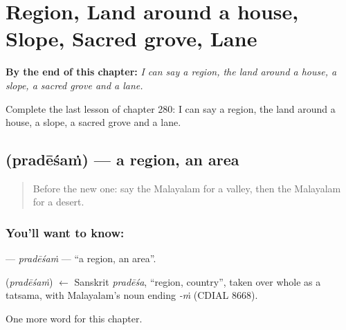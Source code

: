 
\chapter{Region, Land around a house, Slope, Sacred grove, Lane}
\label{ch:ml-region-land-around-a-house-slope-sacred-grove-lane}

\begin{chapteropening}
\textbf{By the end of this chapter:} \emph{I can say a region, the land around a house, a slope, a sacred grove and a lane.}

Complete the last lesson of chapter 280: I can say a region, the land around a house, a slope, a sacred grove and a lane.
\end{chapteropening}

\section[\texorpdfstring{\ml{പ്രദേശം} (pradēśaṁ)}{പ്രദേശം (pradēśaṁ)}]{ (pradēśaṁ) — a region, an area}

\label{lesson:ML-C280-pradesam}



\begin{quote}
Before the new one: say the Malayalam for a valley, then the Malayalam for a desert.
\end{quote}

\subsection*{You'll want to know: }
\textbf{} — \emph{pradēśaṁ} — \textquotedblleft{}a region, an area\textquotedblright{}.

\begin{cousinweb}
\textbf{} (\emph{pradēśaṁ}) $\leftarrow$ Sanskrit \emph{pradēśa}, \textquotedblleft{}region, country\textquotedblright{}, taken over whole as a tatsama, with Malayalam's noun ending \emph{-ṁ} (CDIAL 8668).
\end{cousinweb}

\begin{grammarlens}[title={What you've built}]
One more word for this chapter.
\end{grammarlens}

